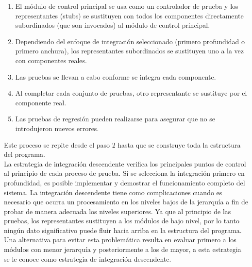\begin{enumerate}
	\item El módulo de control principal se usa como un controlador de prueba y los representantes (stubs) se sustituyen con todos los componentes directamente subordinados (que son invocados) al módulo de control principal.
	\item Dependiendo del enfoque de integración seleccionado (primero profundidad o primero anchura), los representantes subordinados se sustituyen uno a la vez con componentes reales.
	\item Las pruebas se llevan a cabo conforme se integra cada componente.
	\item Al completar cada conjunto de pruebas, otro representante se sustituye por el componente real.
	\item Las pruebas de regresión pueden realizarse para asegurar que no se introdujeron nuevos errores.
\end{enumerate}
Este proceso se repite desde el paso 2 hasta que se construye toda la estructura del programa.\\
La estrategia de integración descendente verifica los principales puntos de control al principio de cada proceso de prueba. Si se selecciona la integración primero en profundidad, es posible implementar y demostrar el funcionamiento completo del sistema. La integración descendente tiene como complicaciones cuando es necesario que ocurra un procesamiento en los niveles bajos de la jerarquía a fin de probar de manera adecuada los niveles superiores. Ya que al principio de las pruebas, los representantes sustituyen a los módulos de bajo nivel, por lo tanto ningún dato significativo puede fluir hacia arriba en la estructura del programa.\\
Una alternativa para evitar esta problemática resulta en evaluar primero a los módulos con menor jerarquía y posteriormente a los de mayor, a esta estrategia se le conoce como estrategia de integración descendente.\\
